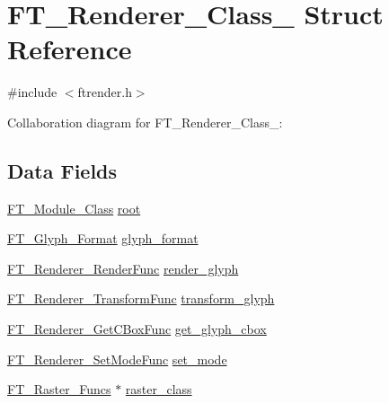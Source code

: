 \hypertarget{struct_f_t___renderer___class__}{}\section{F\+T\+\_\+\+Renderer\+\_\+\+Class\+\_\+ Struct Reference}
\label{struct_f_t___renderer___class__}


{\ttfamily \#include $<$ftrender.\+h$>$}



Collaboration diagram for F\+T\+\_\+\+Renderer\+\_\+\+Class\+\_\+\+:
\subsection*{Data Fields}
\begin{DoxyCompactItemize}
\item 
\hyperlink{ftmodapi_8h_a1bdc5c23cae8b7c61c05966edc4e8343}{F\+T\+\_\+\+Module\+\_\+\+Class} \hyperlink{struct_f_t___renderer___class___a3df4509f1de704596bf4237d6ff8cbd4}{root}
\item 
\hyperlink{ftimage_8h_aeca0d10a27aedecbf96515e0628aff1f}{F\+T\+\_\+\+Glyph\+\_\+\+Format} \hyperlink{struct_f_t___renderer___class___a2c8602452fae27379a6f85bbcb4b525c}{glyph\+\_\+format}
\item 
\hyperlink{ftrender_8h_a569ddb71605a20806879821283c36dd7}{F\+T\+\_\+\+Renderer\+\_\+\+Render\+Func} \hyperlink{struct_f_t___renderer___class___a7a022b8358ce3a06620c62f3542d0d2b}{render\+\_\+glyph}
\item 
\hyperlink{ftrender_8h_ab4503afff651cd78750fd9d3218a9237}{F\+T\+\_\+\+Renderer\+\_\+\+Transform\+Func} \hyperlink{struct_f_t___renderer___class___a2aef09ecdabacf5628ef29fb3d179def}{transform\+\_\+glyph}
\item 
\hyperlink{ftrender_8h_adba414b141b3605331209b8961c3ae2a}{F\+T\+\_\+\+Renderer\+\_\+\+Get\+C\+Box\+Func} \hyperlink{struct_f_t___renderer___class___a4f9dc9b6d86504a8d3b04b4e72936e76}{get\+\_\+glyph\+\_\+cbox}
\item 
\hyperlink{ftrender_8h_a7ed568cf54b436823fea2f8a8864854b}{F\+T\+\_\+\+Renderer\+\_\+\+Set\+Mode\+Func} \hyperlink{struct_f_t___renderer___class___a7cfd4795107157aad4f7efcab77a0f64}{set\+\_\+mode}
\item 
\hyperlink{ftimage_8h_aacdff3aaf6e2dea8cfd9c3b90e15728c}{F\+T\+\_\+\+Raster\+\_\+\+Funcs} $\ast$ \hyperlink{struct_f_t___renderer___class___a5af75b9f582f98f9f74dbcbc530c7e88}{raster\+\_\+class}
\end{DoxyCompactItemize}


